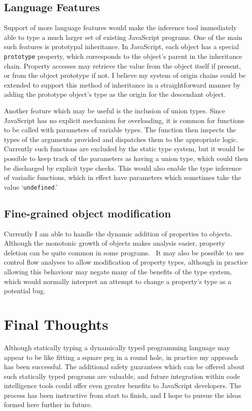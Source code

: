 \documentclass[12pt,a4paper,twoside,openright]{report}
\theoremstyle{definition}
\theoremstyle{dotless}
\newcommand*{\js}{\texttt}
\begin{document}
\subsection{Language Features}

Support of more language features would make the inference tool immediately
able to type a much larger set of existing JavaScript programs. One of the main
such features is prototypal inheritance. In JavaScript, each object has a
special \js{prototype} property, which corresponds to the object's parent in
the inheritance chain. Property accesses may retrieve the value from the
object itself if present, or from the object prototype if not. I believe my 
system of origin chains could be extended to support this method of inheritance 
in a straightforward manner by adding the prototype object's type as the origin
for the descendant object.

Another feature which may be useful is the inclusion of union types.
Since JavaScript has no explicit mechanism for overloading, it is common for
functions to be called with parameters of variable types. The function then
inspects the types of the arguments provided and dispatches them to the
appropriate logic. Currently such functions are excluded by the
static type system, but it would be possible to keep track of the parameters
as having a union type, which could then be discharged by explicit type checks.
This would also enable the type inference of variadic functions, which in effect
have parameters which sometimes take the value `\js{undefined}.'

\subsection{Fine-grained object modification}

Currently I am able to handle the dynamic addition of properties to objects. 
Although the monotonic growth of objects makes analysis easier, property deletion
can be quite common in some programs.~\cite{JSBehaviour} It may also be possible
to use control flow analyses to allow modification of property types, although
in practice allowing this behaviour may negate many of the benefits of the type system, which 
would normally interpret an attempt to change a property's type as a potential bug.

\section{Final Thoughts}

Although statically typing a dynamically typed programming language may appear
to be like fitting a square peg in a round hole, in practice my approach has
been successful. The additional safety guarantees which can be offered about
such statically typed programs are valuable, and future integration within code
intelligence tools could offer even greater benefits to JavaScript developers.
The process has been instructive from start to finish, and I hope to pursue the
ideas formed here further in future.

\printbibliography{}
\end{document}
